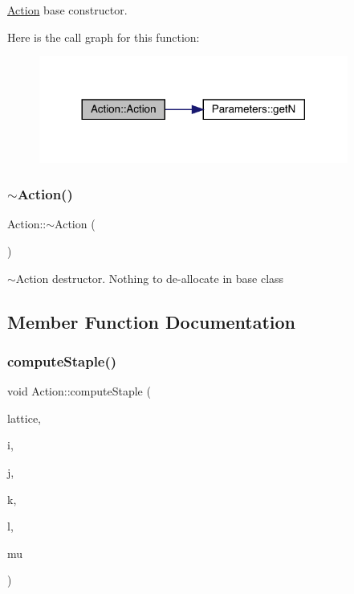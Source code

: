 \mbox{\hyperlink{class_action}{Action}} base constructor. 

Here is the call graph for this function\+:\nopagebreak
\begin{figure}[H]
\begin{center}
\leavevmode
\includegraphics[width=288pt]{class_action_a4f457ccfc8336b565cadca56b36e0271_cgraph}
\end{center}
\end{figure}
\mbox{\label{class_action_acdb06775d157339256a8ecd55749226c}} 
\subsubsection{\texorpdfstring{$\sim$Action()}{~Action()}}
{\footnotesize\ttfamily Action\+::$\sim$\+Action (\begin{DoxyParamCaption}{ }\end{DoxyParamCaption})\hspace{0.3cm}{\ttfamily [virtual]}}



$\sim$\+Action destructor. Nothing to de-\/allocate in base class 



\subsection{Member Function Documentation}
\mbox{\label{class_action_a2d5a64b47a8913955e5911ca072ff80d}} 
\subsubsection{\texorpdfstring{computeStaple()}{computeStaple()}}
{\footnotesize\ttfamily void Action\+::compute\+Staple (\begin{DoxyParamCaption}\item[{\mbox{\hyperlink{class_lattice}{Lattice}}$<$ \mbox{\hyperlink{class_s_u3}{S\+U3}} $>$ $\ast$}]{lattice,  }\item[{unsigned int}]{i,  }\item[{unsigned int}]{j,  }\item[{unsigned int}]{k,  }\item[{unsigned int}]{l,  }\item[{int}]{mu }\end{DoxyParamCaption})\hspace{0.3cm}{\ttfamily [virtual]}}



